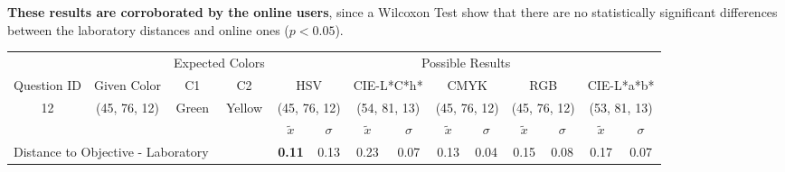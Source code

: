 %
\textbf{These results are corroborated by the online users}, since a Wilcoxon Test show that there are no statistically significant differences between the laboratory distances and online ones ($p < 0.05$).
%
\begin{table}[H]
  \resizebox{\textwidth}{!} {
  \begin{tabular}{lccccccccccccc}
    \hline
    \multicolumn{1}{c}{}                              &                                      & \multicolumn{2}{c}{Expected Colors}                   & \multicolumn{10}{c}{Possible Results}                                                                                                                                                                                                                                                                                        \\ \cline{3-14}
    \multicolumn{1}{c}{\multirow{-2}{*}{Question ID}} & \multirow{-2}{*}{Given Color}        & C1                       & C2                         & \multicolumn{2}{c}{HSV}                                        & \multicolumn{2}{c}{CIE-L*C*h*}                                 & \multicolumn{2}{c}{CMYK}                                       & \multicolumn{2}{c}{RGB}                                        & \multicolumn{2}{c}{CIE-L*a*b*}                                 \\ \hline
    \multicolumn{1}{c}{12}                             & \cellcolor[HTML]{80FF00}(45, 76, 12) & \multicolumn{1}{c|}{Green} & \multicolumn{1}{c|}{Yellow}  & \multicolumn{2}{c|}{\cellcolor[HTML]{80FF00}(45, 76, 12)}      & \multicolumn{2}{c|}{\cellcolor[HTML]{B1FF00}(54, 81, 13)}       & \multicolumn{2}{c|}{\cellcolor[HTML]{80FF00}(45, 76, 12)}       & \multicolumn{2}{c|}{\cellcolor[HTML]{80FF00}(45, 76, 12)}       & \multicolumn{2}{c|}{\cellcolor[HTML]{AEFF00}(53, 81, 13)}       \\ \hline
                                                      & \multicolumn{1}{l}{}                 & \multicolumn{1}{l}{}     & \multicolumn{1}{l}{}       & \multicolumn{1}{c}{$\tilde{x}$} & \multicolumn{1}{c}{$\sigma$} & \multicolumn{1}{c}{$\tilde{x}$} & \multicolumn{1}{c}{$\sigma$} & \multicolumn{1}{c}{$\tilde{x}$} & \multicolumn{1}{c}{$\sigma$} & \multicolumn{1}{c}{$\tilde{x}$} & \multicolumn{1}{c}{$\sigma$} & \multicolumn{1}{c}{$\tilde{x}$} & \multicolumn{1}{c}{$\sigma$} \\ \hline
    \multicolumn{4}{l}{Distance to Objective - Laboratory}                                                                                           & \multicolumn{1}{|c}{\textbf{0.11}}       & \multicolumn{1}{c|}{0.13}    & \multicolumn{1}{|c}{0.23}       & \multicolumn{1}{c|}{0.07}    & \multicolumn{1}{|c}{0.13}       & \multicolumn{1}{c|}{0.04}    & \multicolumn{1}{|c}{0.15}       & \multicolumn{1}{c|}{0.08}    & \multicolumn{1}{|c}{0.17}       & \multicolumn{1}{c|}{0.07}    \\

\end{tabular}}
\end{table}
